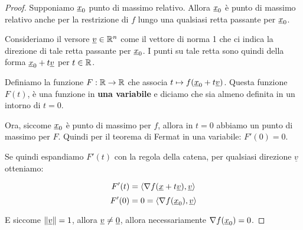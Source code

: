 \filbreak{}
\begin{proof}
    Supponiamo \(\underline{x}_0\) punto di massimo relativo. Allora \(\underline{x}_0\) è punto di massimo relativo anche per la restrizione di \(f\) lungo una qualsiasi retta passante per \(\underline{x}_0\).

    Consideriamo il versore \(\underline{v} \in \mathbb{R}^{n} \) come il vettore di norma 1 che ci indica la direzione di tale retta passante per \(\underline{x}_0\). I punti su tale retta sono quindi della forma \(\underline{x}_0 + t\underline{v}\) per \(t \in \mathbb{R} \).

    Definiamo la funzione \(F: \mathbb{R} \to \mathbb{R} \) che associa \(t \mapsto f(\underline{x}_0 + t\underline{v})\). Questa funzione \(F(t)\), è una funzione in \textbf{una variabile} e diciamo che sia almeno definita in un intorno di \(t=0\).

    Ora, siccome \(\underline{x}_0\) è punto di massimo per \(f\), allora in \(t=0\) abbiamo un punto di massimo per \(F\). Quindi per il teorema di Fermat in una variabile: \(F'(0) = 0\).

    Se quindi espandiamo \(F'(t)\) con la regola della catena, per qualsiasi direzione \(\underline{v}\) otteniamo:

    \[
        F'(t) = \langle\nabla f(\underline{x} + t\underline{v}),\underline{v}\rangle
    \]
    \[
        F'(0) = 0 = \langle\nabla f(\underline{x}_0),\underline{v}\rangle
    \]

    E siccome \(\left\lVert\underline{v}\right\rVert = 1\), allora \(\underline{v} \neq \underline{0} \), allora necessariamente \(\nabla f(\underline{x}_0) = 0\).

\end{proof}

\filbreak{}


